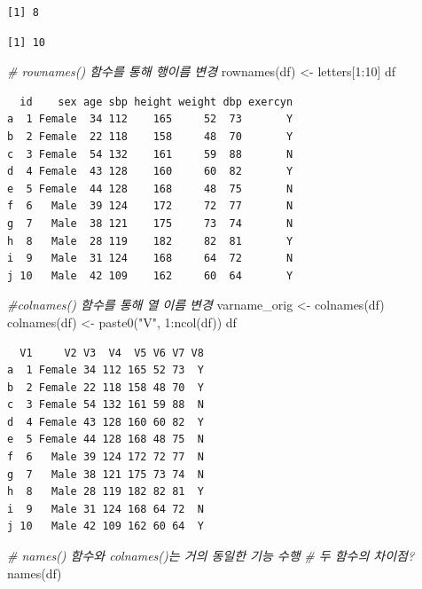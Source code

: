 \documentclass[
  11pt,
]{krantz}
\newenvironment{Shaded}{\begin{snugshade}}{\end{snugshade}}
\newcommand{\CommentTok}[1]{\textcolor[rgb]{0.37,0.37,0.37}{\textit{#1}}}
\newcommand{\DecValTok}[1]{\textcolor[rgb]{0.06,0.06,0.06}{#1}}
\newcommand{\FunctionTok}[1]{\textcolor[rgb]{0,0,0}{#1}}
\newcommand{\NormalTok}[1]{#1}
\newcommand{\OtherTok}[1]{\textcolor[rgb]{0.37,0.37,0.37}{#1}}
\newcommand{\SpecialCharTok}[1]{\textcolor[rgb]{0,0,0}{#1}}
\newcommand{\StringTok}[1]{\textcolor[rgb]{0.5,0.5,0.5}{#1}}
\begin{document}
\begin{verbatim}
[1] 8
\end{verbatim}

\begin{verbatim}
[1] 10
\end{verbatim}

\begin{Shaded}
\begin{Highlighting}[]
\CommentTok{\# rownames() 함수를 통해 행이름 변경}
\FunctionTok{rownames}\NormalTok{(df) }\OtherTok{\textless{}{-}}\NormalTok{ letters[}\DecValTok{1}\SpecialCharTok{:}\DecValTok{10}\NormalTok{]}
\NormalTok{df}
\end{Highlighting}
\end{Shaded}

\begin{verbatim}
  id    sex age sbp height weight dbp exercyn
a  1 Female  34 112    165     52  73       Y
b  2 Female  22 118    158     48  70       Y
c  3 Female  54 132    161     59  88       N
d  4 Female  43 128    160     60  82       Y
e  5 Female  44 128    168     48  75       N
f  6   Male  39 124    172     72  77       N
g  7   Male  38 121    175     73  74       N
h  8   Male  28 119    182     82  81       Y
i  9   Male  31 124    168     64  72       N
j 10   Male  42 109    162     60  64       Y
\end{verbatim}

\begin{Shaded}
\begin{Highlighting}[]
\CommentTok{\#colnames() 함수를 통해 열 이름 변경}
\NormalTok{varname\_orig }\OtherTok{\textless{}{-}} \FunctionTok{colnames}\NormalTok{(df)}
\FunctionTok{colnames}\NormalTok{(df) }\OtherTok{\textless{}{-}} \FunctionTok{paste0}\NormalTok{(}\StringTok{"V"}\NormalTok{, }\DecValTok{1}\SpecialCharTok{:}\FunctionTok{ncol}\NormalTok{(df))}
\NormalTok{df}
\end{Highlighting}
\end{Shaded}

\begin{verbatim}
  V1     V2 V3  V4  V5 V6 V7 V8
a  1 Female 34 112 165 52 73  Y
b  2 Female 22 118 158 48 70  Y
c  3 Female 54 132 161 59 88  N
d  4 Female 43 128 160 60 82  Y
e  5 Female 44 128 168 48 75  N
f  6   Male 39 124 172 72 77  N
g  7   Male 38 121 175 73 74  N
h  8   Male 28 119 182 82 81  Y
i  9   Male 31 124 168 64 72  N
j 10   Male 42 109 162 60 64  Y
\end{verbatim}

\begin{Shaded}
\begin{Highlighting}[]
\CommentTok{\# names() 함수와 colnames()는 거의 동일한 기능 수행}
\CommentTok{\# 두 함수의 차이점? }
\FunctionTok{names}\NormalTok{(df)}
\end{Highlighting}
\end{Shaded}
\end{document}
